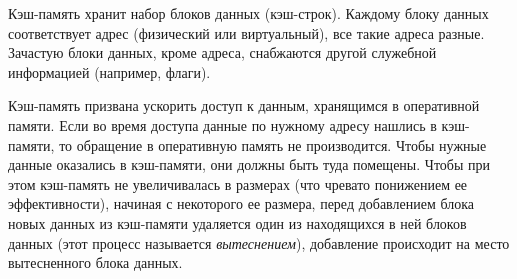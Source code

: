 
Кэш-память хранит набор блоков данных (кэш-строк). Каждому блоку данных соответствует адрес (физический или виртуальный), все такие адреса разные. Зачастую блоки данных, кроме адреса, снабжаются другой служебной информацией (например, флаги).

Кэш-память призвана ускорить доступ к данным, хранящимся в оперативной памяти. Если во время доступа данные по нужному адресу нашлись в кэш-памяти, то обращение в оперативную память не производится. Чтобы нужные данные оказались в кэш-памяти, они должны быть туда помещены. Чтобы при этом кэш-память не увеличивалась в размерах (что чревато понижением ее эффективности), начиная с некоторого ее размера, перед добавлением блока новых данных из кэш-памяти удаляется один из находящихся в ней блоков данных (этот процесс называется \emph{вытеснением}), добавление происходит на место вытесненного блока данных.

